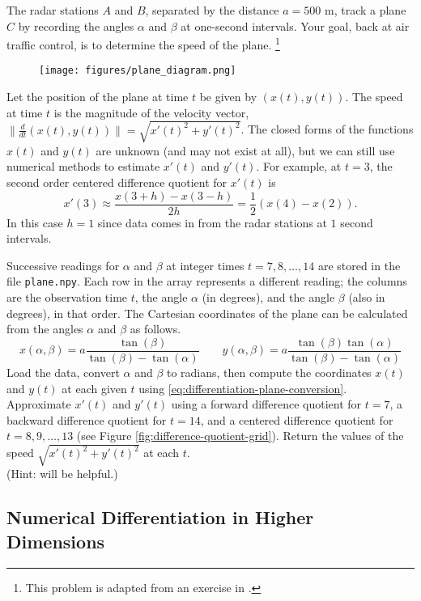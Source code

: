\begin{problem}
The radar stations $A$ and $B$, separated by the distance $a = 500$ m, track a plane $C$ by recording the angles $\alpha$ and $\beta$ at one-second intervals.
Your goal, back at air traffic control, is to determine the speed of the plane.%
\footnote{This problem is adapted from an exercise in \cite{kiusalaas2013numerical}.}
%
\begin{figure}[H]
    \texttt{[image: figures/plane\_diagram.png]}
\end{figure}
%
Let the position of the plane at time $t$ be given by $(x(t),y(t))$.
The speed at time $t$ is the magnitude of the velocity vector, $\|\frac{d}{dt}(x(t),y(t))\| = \sqrt{x'(t)^2 + y'(t)^2}$.
The closed forms of the functions $x(t)$ and $y(t)$ are unknown (and may not exist at all), but we can still use numerical methods to estimate $x'(t)$ and $y'(t)$.
For example, at $t=3$, the second order centered difference quotient for $x'(t)$ is
\[
x'(3) \approx \frac{x(3+h) - x(3-h)}{2h} = \frac{1}{2}(x(4) - x(2)).
\]
In this case $h=1$ since data comes in from the radar stations at $1$ second intervals.

Successive readings for $\alpha$ and $\beta$ at integer times $t=7,8,\ldots,14$ are stored in the file \texttt{plane.npy}.
Each row in the array represents a different reading; the columns are the observation time $t$, the angle $\alpha$ (in degrees), and the angle $\beta$ (also in degrees), in that order.
The Cartesian coordinates of the plane can be calculated from the angles $\alpha$ and $\beta$ as follows.
\begin{equation}
\label{eq:differentiation-plane-conversion}
x(\alpha, \beta) = a \frac{\tan(\beta)}{\tan(\beta)-\tan(\alpha)}
\qquad
y(\alpha, \beta) = a \frac{\tan(\beta)\tan(\alpha)}{\tan(\beta)-\tan(\alpha)}
\end{equation}
Load the data, convert $\alpha$ and $\beta$ to radians, then compute the coordinates $x(t)$ and $y(t)$ at each given $t$ using \ref{eq:differentiation-plane-conversion}.
Approximate $x'(t)$ and $y'(t)$ using a forward difference quotient for $t=7$, a backward difference quotient for $t=14$, and a centered difference quotient for $t=8,9,\ldots,13$ (see Figure \ref{fig:difference-quotient-grid}).
Return the values of the speed $\sqrt{x'(t)^2+y'(t)^2}$ at each $t$.
\\(Hint:  will be helpful.)
\end{problem}

\subsection*{Numerical Differentiation in Higher Dimensions} %

